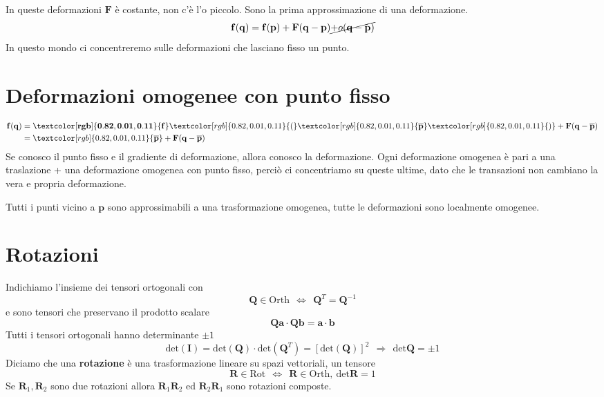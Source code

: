 \documentclass[10pt,a4paper,twoside]{book}
\begin{document}
In queste deformazioni $\mathbf{F}$ è costante, non c'è l'o piccolo. Sono la prima approssimazione di una deformazione.
\begin{equation*}
\mathbf{f}(\mathbf{q}) =\mathbf{f}(\mathbf{p}) +\mathbf{F}(\mathbf{q} -\mathbf{p})\cancel{+o(\mathbf{q} -\mathbf{p})}
\end{equation*}
In questo mondo ci concentreremo sulle deformazioni che lasciano fisso un punto.
\section{Deformazioni omogenee con punto fisso}
\begin{equation*}
\begin{aligned}
\mathbf{f}(\mathbf{q}) & =\mathbf{\textcolor[rgb]{0.82,0.01,0.11}{f}}\textcolor[rgb]{0.82,0.01,0.11}{(}\textcolor[rgb]{0.82,0.01,0.11}{\overline{\mathbf{p}}}\textcolor[rgb]{0.82,0.01,0.11}{)} +\mathbf{F}(\mathbf{q} -\overline{\mathbf{p}})\\
 & =\textcolor[rgb]{0.82,0.01,0.11}{\overline{\mathbf{p}}} +\mathbf{F}(\mathbf{q} -\overline{\mathbf{p}})
\end{aligned}
\end{equation*}
Se conosco il punto fisso e il gradiente di deformazione, allora conosco la deformazione. Ogni deformazione omogenea è pari a una traslazione + una deformazione omogenea con punto fisso, perciò ci concentriamo su queste ultime, dato che le transazioni non cambiano la vera e propria deformazione.

Tutti i punti vicino a $\mathbf{p}$ sono approssimabili a una trasformazione omogenea, tutte le deformazioni sono localmente omogenee.
\section{Rotazioni}

Indichiamo l'insieme dei tensori ortogonali con
\begin{equation*}
\boxed{\mathbf{Q} \in \mathrm{Orth}} \ \ \Leftrightarrow \ \ \boxed{\mathbf{Q}^{T} =\mathbf{Q}^{-1}}
\end{equation*}
e sono tensori che preservano il prodotto scalare
\begin{equation*}
\mathbf{Qa} \cdotp \mathbf{Qb} =\mathbf{a} \cdotp \mathbf{b}
\end{equation*}
Tutti i tensori ortogonali hanno determinante $\pm 1$
\begin{equation*}
\mathrm{det}(\mathbf{I}) =\mathrm{det}(\mathbf{Q}) \cdotp \mathrm{det}\left(\mathbf{Q}^{T}\right) =[\mathrm{det}(\mathbf{Q})]^{2} \ \ \Rightarrow \ \ \mathrm{det}\mathbf{Q} =\pm 1
\end{equation*}
Diciamo che una \textbf{rotazione} è una trasformazione lineare su spazi vettoriali, un tensore
\begin{equation*}
\boxed{\mathbf{R} \in \mathrm{Rot}} \ \ \Leftrightarrow \ \ \boxed{\mathbf{R} \in \mathrm{Orth} ,\ \mathrm{det}\mathbf{R} =1}
\end{equation*}
Se $\mathbf{R}_{1} ,\mathbf{R}_{2}$ sono due rotazioni allora $\mathbf{R}_{1}\mathbf{R}_{2}$ ed $\mathbf{R}_{2}\mathbf{R}_{1}$ sono rotazioni composte.
\end{document}
